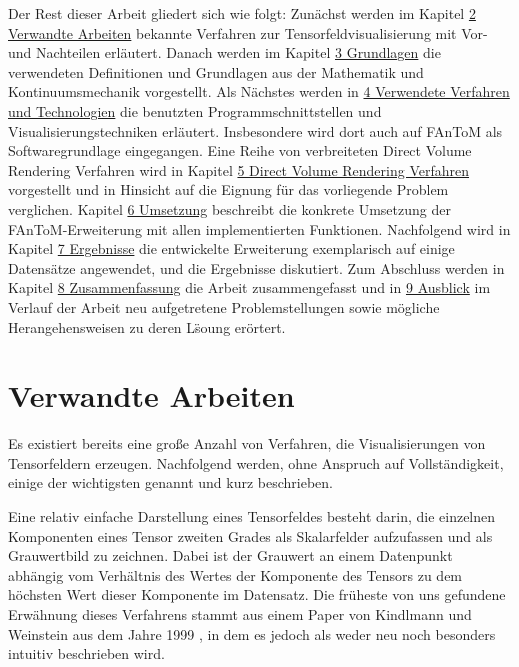 \documentclass[a4paper,fontsize=12pt,toc=bib,parskip=half,ngerman]{scrartcl}
\begin{document}
Der Rest dieser Arbeit gliedert sich wie folgt: Zun\"achst werden im Kapitel \hyperref[sec:Verwandte]{2 Verwandte Arbeiten} bekannte Verfahren zur Tensorfeldvisualisierung mit Vor- und Nachteilen erl\"autert. Danach werden im Kapitel \hyperref[sec:Grundlagen]{3 Grundlagen} die verwendeten Definitionen und Grundlagen aus der Mathematik und Kontinuumsmechanik vorgestellt. Als N\"achstes werden in \hyperref[sec:Technologien]{4 Verwendete Verfahren und Technologien} die benutzten Programmschnittstellen und Visualisierungstechniken erl\"autert. Insbesondere wird dort auch auf FAnToM als Softwaregrundlage eingegangen. Eine Reihe von verbreiteten Direct Volume Rendering Verfahren wird in Kapitel \hyperref[sec:DVR]{5 Direct Volume Rendering Verfahren} vorgestellt und in Hinsicht auf die Eignung f\"ur das vorliegende Problem verglichen. Kapitel \hyperref[sec:Umsetzung]{6 Umsetzung} beschreibt die konkrete Umsetzung der FAnToM-Erweiterung mit allen implementierten Funktionen. Nachfolgend wird in Kapitel \hyperref[sec:Ergebnisse]{7 Ergebnisse} die entwickelte Erweiterung exemplarisch auf einige Datens\"atze angewendet, und die Ergebnisse diskutiert. Zum Abschluss werden in Kapitel \hyperref[sec:Zusammenfassung]{8 Zusammenfassung} die Arbeit zusammengefasst und in  \hyperref[sec:Ausblick]{9 Ausblick} im Verlauf der Arbeit neu aufgetretene Problemstellungen sowie m\"ogliche Herangehensweisen zu deren L\"soung er\"ortert.
 
\section{Verwandte Arbeiten}
\label{sec:Verwandte}
Es existiert bereits eine gro{\ss}e Anzahl von Verfahren, die Visualisierungen von Tensorfeldern erzeugen. Nachfolgend werden, ohne Anspruch auf Vollst\"andigkeit, einige der wichtigsten genannt und kurz beschrieben.

Eine relativ einfache Darstellung eines Tensorfeldes besteht darin, die einzelnen Komponenten eines Tensor zweiten Grades als Skalarfelder aufzufassen und als Grauwertbild zu zeichnen. Dabei ist der Grauwert an einem Datenpunkt abh\"angig vom Verh\"altnis des Wertes der Komponente des Tensors zu dem h\"ochsten Wert dieser Komponente im Datensatz. Die fr\"uheste von uns gefundene Erw\"ahnung dieses Verfahrens stammt aus einem Paper von Kindlmann und Weinstein aus dem Jahre 1999 \cite{kindlmann1999hue}, in dem es jedoch als weder neu noch besonders intuitiv beschrieben wird. 
\end{document}
